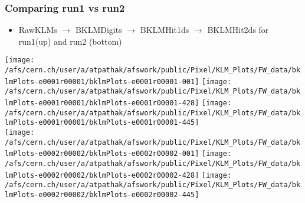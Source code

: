 \documentclass{beamer}
\begin{document}
\begin{frame}
\frametitle{Comparing run1 vs run2}
\vspace*{.05cm}

\begin{itemize} 
\item {\small RawKLMs $\to$ BKLMDigits $\to$  BKLMHit1ds $\to$ BKLMHit2ds for run1(up) and run2 (bottom) }
 \end{itemize}

\begin{center}
\begin{normalsize}

\vspace*{-.2cm}
\begin{center}

\texttt{[image: /afs/cern.ch/user/a/atpathak/afswork/public/Pixel/KLM\_Plots/FW\_data/bklmPlots-e0001r00001/bklmPlots-e0001r00001-001]}
\texttt{[image: /afs/cern.ch/user/a/atpathak/afswork/public/Pixel/KLM\_Plots/FW\_data/bklmPlots-e0001r00001/bklmPlots-e0001r00001-428]}
\texttt{[image: /afs/cern.ch/user/a/atpathak/afswork/public/Pixel/KLM\_Plots/FW\_data/bklmPlots-e0001r00001/bklmPlots-e0001r00001-445]}
\\

\texttt{[image: /afs/cern.ch/user/a/atpathak/afswork/public/Pixel/KLM\_Plots/FW\_data/bklmPlots-e0002r00002/bklmPlots-e0002r00002-001]}
\texttt{[image: /afs/cern.ch/user/a/atpathak/afswork/public/Pixel/KLM\_Plots/FW\_data/bklmPlots-e0002r00002/bklmPlots-e0002r00002-428]}
\texttt{[image: /afs/cern.ch/user/a/atpathak/afswork/public/Pixel/KLM\_Plots/FW\_data/bklmPlots-e0002r00002/bklmPlots-e0002r00002-445]}

\end{center}
\end{normalsize}
\end{center}
\end{frame}
\end{document}
